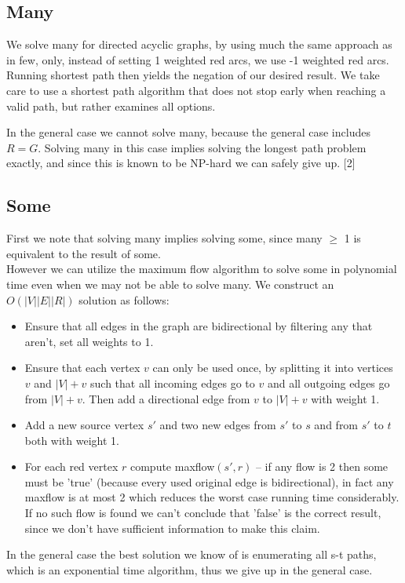 \documentclass{tufte-handout}
\begin{document}
\subsection{Many}
We solve many for directed acyclic graphs,
by using much the same approach as in few,
only, instead of setting 1 weighted red arcs,
we use -1 weighted red arcs.
Running shortest path then yields the negation
of our desired result.
We take care to use a shortest path algorithm
that does not stop early when reaching a valid path,
but rather examines all options.

In the general case we cannot solve many,
because the general case includes $R = G$.
Solving many in this case implies solving 
the longest path problem exactly, 
and since this is known to be NP-hard
we can safely give up. [2]

\subsection{Some}
First we note that solving many implies solving some,
since many $\ge$ 1 is equivalent to the result of some. \\

However we can utilize the maximum flow algorithm to solve
some in polynomial time even when we may not be able to solve many.
We construct an $O(|V||E||R|)$ solution as follows:
\begin{itemize}
  \item Ensure that all edges in the graph are bidirectional by filtering any that aren't, set all weights to 1.
  \item Ensure that each vertex $v$ can only be used once, by splitting it into vertices $v$ and $|V|+v$ such that all incoming edges go to
  $v$ and all outgoing edges go from $|V|+v$. Then add a directional edge from $v$ to $|V|+v$ with weight 1.
  \item Add a new source vertex $s'$ and two new edges from $s'$ to $s$ and from $s'$ to $t$ both with weight 1.
  \item For each red vertex $r$ compute maxflow$(s', r)$ -- if any flow is 2
    then some must be 'true' (because every used original edge is
    bidirectional), in fact any maxflow is at most 2 which reduces the worst
    case running time considerably.
    If no such flow is found we can't conclude that 'false' is the 
    correct result, since we don't have sufficient information to make this claim.
\end{itemize}

In the general case the best solution we know of is 
enumerating all s-t paths, which is an exponential time algorithm,
thus we give up in the general case.
\end{document}
